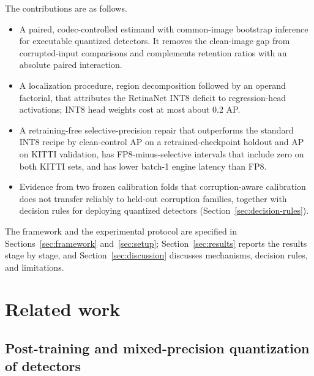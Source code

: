 \documentclass[a4paper,fleqn]{cas-dc}
\begin{document}
The contributions are as follows.
\begin{itemize}[leftmargin=1.45em,itemsep=2pt,topsep=3pt,parsep=0pt]
  \item A paired, codec-controlled estimand with common-image bootstrap inference for executable quantized detectors. It removes the clean-image gap from corrupted-input comparisons and complements retention ratios with an absolute paired interaction.
  \item A localization procedure, region decomposition followed by an operand factorial, that attributes the RetinaNet INT8 deficit to regression-head activations; INT8 head weights cost at most about 0.2 AP.
  \item A retraining-free selective-precision repair that outperforms the standard INT8 recipe by \nnHvSelGainPt{} clean-control AP on a retrained-checkpoint holdout and \nnSelGainJKitti{} AP on KITTI validation, has FP8-minus-selective intervals that include zero on both KITTI sets, and has lower batch-1 engine latency than FP8.
  \item Evidence from two frozen calibration folds that corruption-aware calibration does not transfer reliably to held-out corruption families, together with decision rules for deploying quantized detectors (Section~\ref{sec:decision-rules}).
\end{itemize}

The framework and the experimental protocol are specified in Sections~\ref{sec:framework} and~\ref{sec:setup}; Section~\ref{sec:results} reports the results stage by stage, and Section~\ref{sec:discussion} discusses mechanisms, decision rules, and limitations.

\section{Related work}
\label{sec:related-work}

\subsection{Post-training and mixed-precision quantization of detectors}
\end{document}
